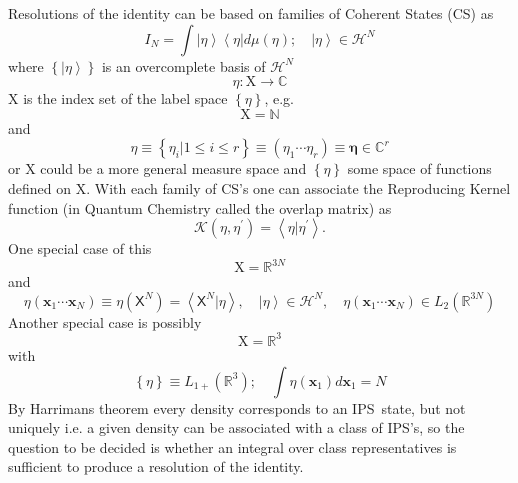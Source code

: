 \documentclass[aps,preprint]{revtex4}
\begin{document}
Resolutions of the identity can be based on families of Coherent States (CS)
as 
\begin{equation}
I_{N}=\int \left\vert \eta \right\rangle \left\langle \eta \right\vert d\mu
\left( \eta \right) ;\quad \left\vert \eta \right\rangle \in \mathcal{H}^{N}
\label{res_id}
\end{equation}%
where $\left\{ \left\vert \eta \right\rangle \right\} $ is an overcomplete
basis of $\mathcal{H}^{N}$ 
\begin{equation}
\eta :\mathrm{X\rightarrow }\mathbb{C}
\end{equation}%
$\mathrm{X}$ is the index set of the label space $\left\{ \eta \right\} $,
e.g. 
\begin{equation}
\mathrm{X}=\mathbb{N}
\end{equation}%
and 
\begin{equation}
\eta \equiv \left\{ \eta _{i}|1\leq i\leq r\right\} \equiv \left( \eta
_{1}\cdots \eta _{r}\right) \equiv \mathbf{\eta \in }\mathbb{C}^{r}
\end{equation}%
or $\mathrm{X}$ could be a more general measure space and $\left\{ \eta
\right\} $ some space of functions defined on $\mathrm{X}$. With each family
of CS's one can associate the Reproducing Kernel function (in Quantum
Chemistry called the overlap matrix) as 
\begin{equation}
\mathcal{K}\left( \eta ,\eta ^{\prime }\right) =\left\langle \eta |\eta
^{\prime }\right\rangle .
\end{equation}%
One special case of this 
\begin{equation}
\mathrm{X}=\mathbb{R}^{3N}
\end{equation}%
and 
\begin{equation}
\eta \left( \mathbf{x}_{1}\cdots \mathbf{x}_{N}\right) \equiv \eta \left( 
\mathsf{X}^{N}\right) =\left\langle \mathsf{X}^{N}|\eta \right\rangle ,\quad
\left\vert \eta \right\rangle \in \mathcal{H}^{N},\quad \eta \left( \mathbf{x%
}_{1}\cdots \mathbf{x}_{N}\right) \in L_{2}\left( \mathbb{R}^{3N}\right)
\end{equation}%
Another special case is possibly 
\begin{equation}
\mathrm{X}=\mathbb{R}^{3}
\end{equation}%
with 
\begin{equation}
\left\{ \eta \right\} \equiv L_{1+}\left( \mathbb{R}^{3}\right) ;\quad \int
\eta \left( \mathbf{x}_{1}\right) d\mathbf{x}_{1}=N
\end{equation}%
By Harrimans theorem every density corresponds to an IPS\ state, but not
uniquely i.e. a given density can be associated with a class of IPS's, so
the question to be decided is whether an integral over class representatives
is sufficient to produce a resolution of the identity.
\end{document}
